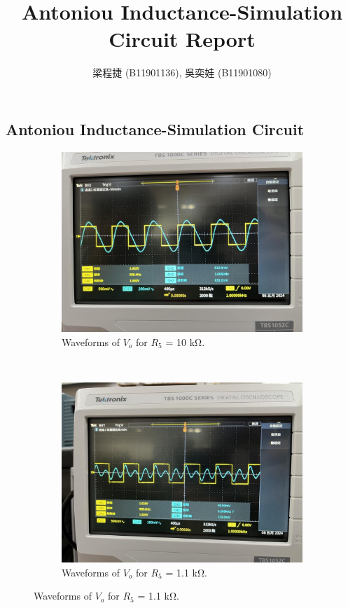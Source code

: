 \documentclass{article}
\title{Antoniou Inductance-Simulation Circuit Report}
\author{梁程捷 (B11901136), 吳奕娃 (B11901080)}
\date{}
\begin{document}
\begin{CJK*}{UTF8}{bkai}
\maketitle

\section*{Antoniou Inductance-Simulation Circuit}

\begin{figure}[h]
    \begin{center}
        \begin{subfigure}[b]{0.45\textwidth}
            \includegraphics[width=\textwidth]{1st_harmonic.jpg}
            \caption*{Waveforms of $V_o$ for $R_5$ = 10 \unit{\kilo\ohm}.}
        \end{subfigure}
        ~
        \begin{subfigure}[b]{0.45\textwidth}
            \includegraphics[width=\textwidth]{3rd_harmonic.jpg}
            \caption*{Waveforms of $V_o$ for $R_5$ = 1.1 \unit{\kilo\ohm}.}
        \end{subfigure}
    \end{center}
\end{figure}


\end{CJK*}
\end{document}
